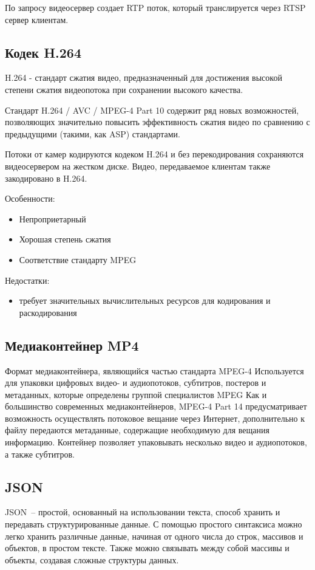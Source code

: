 По запросу видеосервер создает RTP поток, который транслируется через RTSP сервер клиентам.

\subsection{Кодек H.264}
H.264 - стандарт сжатия видео, предназначенный для достижения высокой степени сжатия видеопотока
при сохранении высокого качества.

Стандарт H.264 / AVC / MPEG-4 Part 10 содержит ряд новых возможностей, позволяющих значительно
повысить эффективность сжатия видео по сравнению с предыдущими (такими, как ASP) стандартами.

Потоки от камер кодируются кодеком H.264 и без перекодирования сохраняются видеосервером на
жестком диске. Видео, передаваемое клиентам также закодировано в H.264.

\medskip

Особенности:
\smallskip
\begin{itemize}
	\item Непроприетарный
	\item Хорошая степень сжатия
	\item Соответствие стандарту MPEG
\end{itemize}

\medskip

Недостатки:
\smallskip
\begin{itemize}
	\item требует значительных вычислительных ресурсов для кодирования и раскодирования
\end{itemize}

\subsection{Медиаконтейнер MP4}
Формат медиаконтейнера, являющийся частью стандарта MPEG-4
Используется для упаковки цифровых видео- и аудиопотоков, субтитров, постеров и метаданных,
которые определены группой специалистов MPEG
Как и большинство современных медиаконтейнеров, MPEG-4 Part 14 предусматривает возможность
осуществлять потоковое вещание через Интернет, дополнительно к файлу передаются метаданные,
содержащие необходимую для вещания информацию.
Контейнер позволяет упаковывать несколько видео и аудиопотоков, а также субтитров.

\subsection{JSON}
JSON~-- простой, основанный на использовании текста, способ хранить и передавать структурированные
данные. С помощью простого синтаксиса  можно легко хранить различные данные, начиная от одного числа
до строк, массивов и объектов, в простом тексте. Также можно связывать между собой массивы и объекты,
создавая сложные структуры данных.

